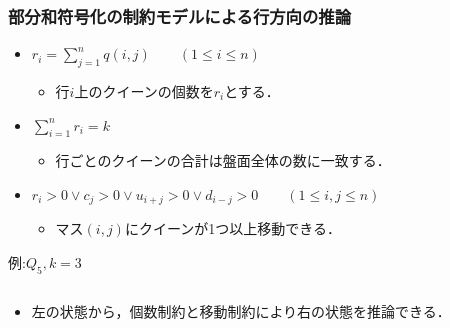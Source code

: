 \documentclass[dvipdfmx,10pt]{beamer}
\begin{document}
\begin{frame}\frametitle{部分和符号化の制約モデルによる行方向の推論}
  \begin{itemize}
   \item {}\quad $r_{i}=\sum\limits_{j=1}^{n} 
	      q(i,j) \qquad (1 \leq i \leq n)$ 
	 \begin{itemize}
	  \item 行$i$上のクイーンの個数を$r_i$とする．
	 \end{itemize}
   \item {}\quad $\sum\limits_{i=1}^{n}r_{i} = k$
	 \begin{itemize}
	  \item 行ごとのクイーンの合計は盤面全体の数に一致する．
	 \end{itemize}
   \item {}\quad $r_{i}>0 \vee c_{j}>0 \vee 
	 u_{i+j}>0 \vee d_{i-j} > 0  \qquad (1\leq i,j \leq n)$ 
	 \begin{itemize}
	  \item マス$(i,j)$にクイーンが1つ以上移動できる．
	 \end{itemize}
  \end{itemize}
 \begin{exampleblock}{例:$Q_{5},k=3$}
  \begin{columns}
   \begin{column}{0.3\textwidth}
    \centering
    \scalebox{0.9}{
    
    }
   \end{column}
   \begin{column}{0.3\textwidth}
    \centering
    \scalebox{0.9}{
    
    }
   \end{column}
  \end{columns}
  \begin{itemize}
   \item 左の状態から，個数制約と移動制約により右の状態を推論できる．
  \end{itemize}
 \end{exampleblock}
\end{frame}
\end{document}
